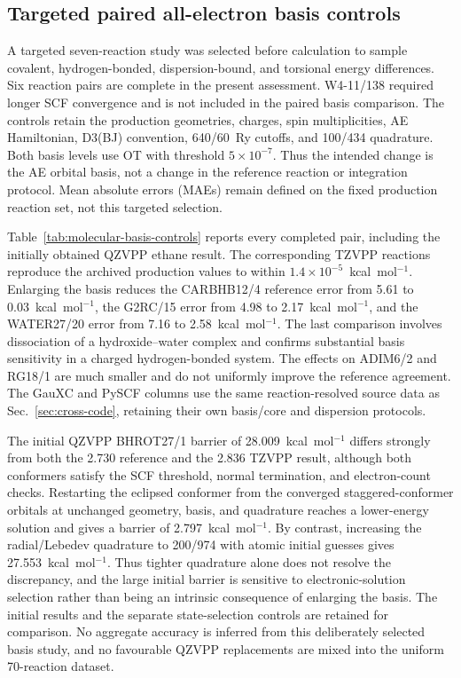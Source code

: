 \subsection{Targeted paired all-electron basis controls}
\label{sec:molecular-basis-controls}

A targeted seven-reaction study was selected before calculation to sample covalent, hydrogen-bonded, dispersion-bound, and torsional energy differences. Six reaction pairs are complete in the present assessment. W4-11/138 required longer SCF convergence and is not included in the paired basis comparison. The controls retain the production geometries, charges, spin multiplicities, AE Hamiltonian, D3(BJ) convention, 640/60~Ry cutoffs, and 100/434 quadrature. Both basis levels use OT with threshold $5\times10^{-7}$. Thus the intended change is the AE orbital basis, not a change in the reference reaction or integration protocol. Mean absolute errors (MAEs) remain defined on the fixed production reaction set, not this targeted selection.

Table~\ref{tab:molecular-basis-controls} reports every completed pair, including the initially obtained QZVPP ethane result. The corresponding TZVPP reactions reproduce the archived production values to within $1.4\times10^{-5}$~kcal~mol$^{-1}$. Enlarging the basis reduces the CARBHB12/4 reference error from 5.61 to 0.03~kcal~mol$^{-1}$, the G2RC/15 error from 4.98 to 2.17~kcal~mol$^{-1}$, and the WATER27/20 error from 7.16 to 2.58~kcal~mol$^{-1}$. The last comparison involves dissociation of a hydroxide--water complex and confirms substantial basis sensitivity in a charged hydrogen-bonded system. The effects on ADIM6/2 and RG18/1 are much smaller and do not uniformly improve the reference agreement. The GauXC and PySCF columns use the same reaction-resolved source data as Sec.~\ref{sec:cross-code}, retaining their own basis/core and dispersion protocols.



The initial QZVPP BHROT27/1 barrier of 28.009~kcal~mol$^{-1}$ differs strongly from both the 2.730 reference and the 2.836 TZVPP result, although both conformers satisfy the SCF threshold, normal termination, and electron-count checks. Restarting the eclipsed conformer from the converged staggered-conformer orbitals at unchanged geometry, basis, and quadrature reaches a lower-energy solution and gives a barrier of 2.797~kcal~mol$^{-1}$. By contrast, increasing the radial/Lebedev quadrature to 200/974 with atomic initial guesses gives 27.553~kcal~mol$^{-1}$. Thus tighter quadrature alone does not resolve the discrepancy, and the large initial barrier is sensitive to electronic-solution selection rather than being an intrinsic consequence of enlarging the basis. The initial results and the separate state-selection controls are retained for comparison. No aggregate accuracy is inferred from this deliberately selected basis study, and no favourable QZVPP replacements are mixed into the uniform 70-reaction dataset.

